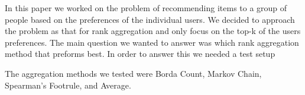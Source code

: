 In this paper we worked on the problem of recommending items to a group of people based on the preferences of the individual users. We decided to approach the problem as that for rank aggregation and only focus on the top-k of the users preferences. 
The main question we wanted to answer was which rank aggregation method that preforms best. In order to answer this we needed a test setup 

The aggregation methods we tested were Borda Count, Markov Chain, Spearman's Footrule, and Average. 



